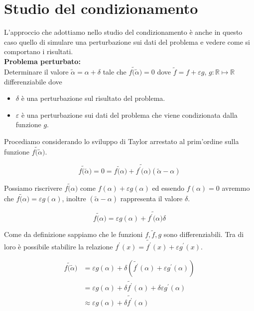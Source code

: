 \documentclass[12pt, a4paper]{book}
\theoremstyle{definition}
\begin{document}
\section{Studio del condizionamento}
\begin{flushleft}
L'approccio che adottiamo nello studio del condizionamento è anche in questo caso quello di simulare una perturbazione sui dati del problema e vedere come si comportano i risultati.\\
\vspace{1em}
\textbf{Problema perturbato:}\\
Determinare il valore $\tilde{\alpha} = \alpha + \delta$ tale che $\tilde{f(\tilde{\alpha}}) = 0$ dove $\tilde{f} = f + \varepsilon g$,  $g : \mathbb{R} \mapsto \mathbb{R} $ differenziabile dove
\begin{itemize}
	\item $\delta$ è una perturbazione sul risultato del problema.
	\item $\varepsilon$ è una perturbazione sui dati del problema che viene condizionata dalla funzione $g$.
\end{itemize}
\vspace{1em}
Procediamo considerando lo sviluppo di Taylor arrestato al prim'ordine sulla funzione $\tilde{f(\tilde{\alpha}})$.

\begin{equation}
	\tilde{f(\tilde{\alpha}}) = 0 = \tilde{f(\alpha}) + \tilde{f^{'}(\alpha})(\tilde{\alpha} - \alpha)
\end{equation}

Possiamo riscrivere $\tilde{f(\alpha})$ come $f(\alpha) + \varepsilon g(\alpha)$ ed essendo $f(\alpha) = 0$ avremmo che $\tilde{f(\alpha}) =  \varepsilon g(\alpha)$, inoltre $(\tilde{\alpha} - \alpha)$ rappresenta il valore $\delta$.

\begin{equation}
	\tilde{f(\alpha}) = \varepsilon g(\alpha) + \tilde{f^{'}(\alpha})\delta
\end{equation}

Come da definizione sappiamo che le funzioni $f, \tilde{f}, g$ sono differenziabili.  Tra di loro è possibile stabilire la relazione  $f^{'}(x) = \tilde{f^{'}}(x) + \varepsilon g^{'}(x)$.

\begin{equation}
	\begin{split}
		\tilde{f(\tilde{\alpha}}) &= \varepsilon g(\alpha) + \delta (\tilde{f^{'}}(\alpha) + \varepsilon g^{'}(\alpha)) \\
										  &= \varepsilon g(\alpha) + \delta \tilde{f^{'}}(\alpha) + \delta \varepsilon g^{'}(\alpha) \\
										  & \approx \varepsilon g(\alpha) + \delta \tilde{f^{'}}(\alpha)
	\end{split}
\end{equation}
 

\end{flushleft}
\end{document}
